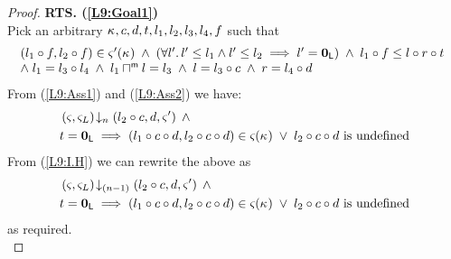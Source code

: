 \begin{lemma}[]
\begin{proof}
\noindent\textbf{RTS. (\ref{L9:Goal1})}\\
Pick an arbitrary $\kappa_{}, c, d, t, l_1, l_2, l_3, l_4, f$ such that
%
\begin{equation}
\hspace*{-0.15cm}
\begin{array}{l}
	(l_1 \composeL f, l_2 \composeL f) \in \amod{}'(\ca{}) \;\land\; 
	\left(\for{l'} l' \leq l_1 \land l' \leq l_2 \implies l' = \unitL \right)
	\;\land\; l_1 \composeL f \leq l \composeL r \composeL t\\
%
	\land\; l_1 = l_3 \composeL l_4 \;\land\; 	l_1 \maxMeetL l = l_3 \;\land\; l = l_3 \composeL c \;\land\; r = l_4 \composeL d
\end{array} \label{L9:Ass2}
\end{equation}
%
From (\ref{L9:Ass1}) and (\ref{L9:Ass2}) we have:
%
\begin{align}
	& \left(\varsigma_{}, \varsigma_{L}\right) \!\downarrow_{n} \left(l_2 \circ c, d, \varsigma_{}'\right) \nonumber \;\land\\
	& t = \mathbf{0}_{\textsf{L}} \implies (l_1 \circ c \circ d, l_2 \circ c \circ d) \in \varsigma_{}(\kappa_{}) \;\lor\; l_2 \circ c \circ d \text{ is undefined} \nonumber
\end{align}
%
From (\ref{L9:I.H}) we can rewrite the above as 
%
\begin{align}
	& \left(\varsigma_{}, \varsigma_{L}\right) \!\downarrow_{(n-1)} \left(l_2 \circ c, d, \varsigma_{}'\right) \nonumber \;\land\\
	& t = \mathbf{0}_{\textsf{L}} \implies (l_1 \circ c \circ d, l_2 \circ c \circ d) \in \varsigma_{}(\kappa_{}) \;\lor\; l_2 \circ c \circ d \text{ is undefined} \label{L9:Ass3}
\end{align}
%
as required.\\


\end{proof}
\end{lemma}
